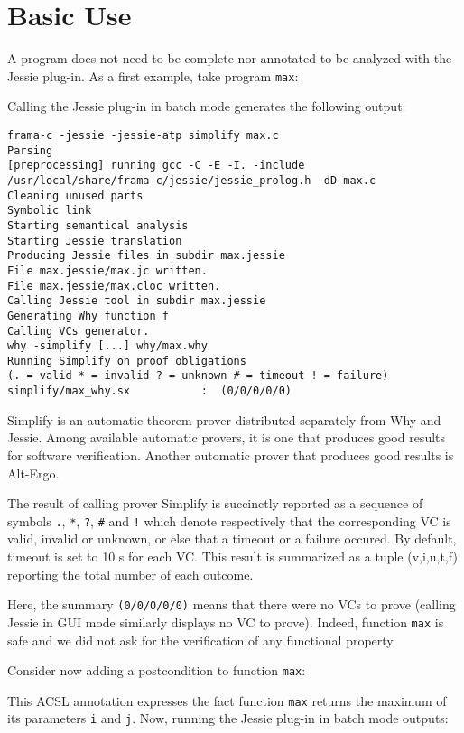 \documentclass[a4paper,11pt,twoside,openright]{report}
\begin{document}
\section{Basic Use}

A program does not need to be complete nor annotated to be analyzed
with the Jessie plug-in. As a first example, take program \verb|max|:



Calling the Jessie plug-in in batch mode generates the following output:

\begin{verbatim}
frama-c -jessie -jessie-atp simplify max.c
Parsing
[preprocessing] running gcc -C -E -I. -include
/usr/local/share/frama-c/jessie/jessie_prolog.h -dD max.c
Cleaning unused parts
Symbolic link
Starting semantical analysis
Starting Jessie translation
Producing Jessie files in subdir max.jessie
File max.jessie/max.jc written.
File max.jessie/max.cloc written.
Calling Jessie tool in subdir max.jessie
Generating Why function f
Calling VCs generator.
why -simplify [...] why/max.why
Running Simplify on proof obligations
(. = valid * = invalid ? = unknown # = timeout ! = failure)
simplify/max_why.sx           :  (0/0/0/0/0)
\end{verbatim}

Simplify is an automatic theorem prover distributed separately from Why
and Jessie. Among available automatic provers, it is one that
produces good results for software verification. Another automatic
prover that produces good results is Alt-Ergo.

The result of calling prover Simplify is succinctly reported as a
sequence of symbols \verb|.|, \verb|*|, \verb|?|, \verb|#| and
\verb|!| which denote respectively that the corresponding VC is valid,
invalid or unknown, or else that a timeout or a failure occured. By
default, timeout is set to 10 s for each VC. This result is summarized
as a tuple (v,i,u,t,f) reporting the total number of each outcome.

Here, the summary \verb|(0/0/0/0/0)| means that there were no VCs to prove
(calling Jessie in GUI mode similarly displays no VC to
prove). Indeed, function \verb|max| is safe and we did not ask for the
verification of any functional property.

Consider now adding a postcondition to function \verb|max|:



This ACSL annotation expresses the fact function \verb|max| returns
the maximum of its parameters \verb|i| and \verb|j|. Now, running the
Jessie plug-in in batch mode outputs:
\end{document}
